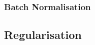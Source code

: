 
\subsubsection{Batch Normalisation}

\subsection{Regularisation}
\cite{Srivastava2014DropoutAS}
\cite{OrrGenevieveB.1998NNTo}
